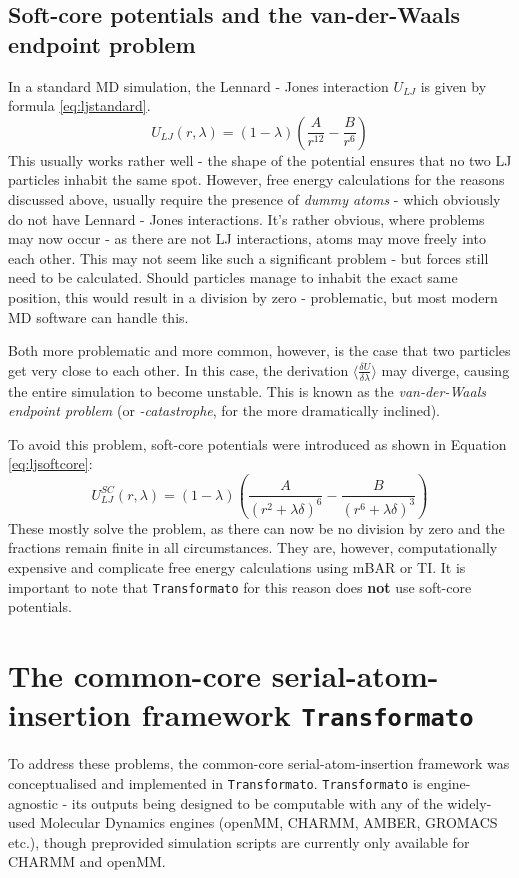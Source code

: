 \documentclass[oneside]{scrreprt}
\begin{document}
\subsection{Soft-core potentials and the van-der-Waals endpoint problem}
In a standard MD simulation, the Lennard - Jones interaction $U_{LJ}$ is given by formula \ref{eq:ljstandard}.
\begin{equation}
U_{LJ}(r,\lambda)=(1-\lambda)(\frac{A}{r^{12}} - \frac{B}{r^6})
\label{eq:ljstandard}
\end{equation}
This usually works rather well -  the shape of the potential ensures that no two LJ particles inhabit the same spot. However, free energy calculations for the reasons discussed above, usually require the presence of \textit{dummy atoms} - which obviously do not have Lennard - Jones interactions. It's rather obvious, where problems may now occur -  as there are not LJ interactions, atoms may move freely into each other. This may not seem like such a significant problem - but forces still need to be calculated. Should particles manage to inhabit the exact same position, this would result in a division by zero - problematic, but most modern MD software can handle this. 

Both more problematic and more common, however, is the case that two particles get very close to each other. In this case, the derivation $\langle \frac{\delta U}{\delta\lambda} \rangle$ may diverge, causing the entire simulation to become unstable. This is known as the \textit{van-der-Waals endpoint problem} (or \textit{-catastrophe}, for the more dramatically inclined).

To avoid this problem, soft-core potentials were introduced as shown in Equation \ref{eq:ljsoftcore}\supercite{Beutler1994Jun}:
\begin{equation}
U_{LJ}^{SC}(r,\lambda)=(1-\lambda)(\frac{A}{(r^2 +\lambda \delta)^6 }-\frac{B}{(r^6 +\lambda \delta)^3})
\label{eq:ljsoftcore}
\end{equation}
These mostly solve the problem, as there can now be no division by zero and the fractions remain finite in all circumstances. They are, however, computationally expensive and complicate free energy calculations using mBAR or TI\supercite{Li2020Aug}. It is important to note that \texttt{Transformato} for this reason does \textbf{not} use soft-core potentials.


\section{The common-core serial-atom-insertion framework {\texttt{Transformato}}}
To address these problems, the common-core serial-atom-insertion framework was conceptualised and implemented in \texttt{Transformato}. \texttt{Transformato} is engine-agnostic - its outputs being designed to be computable with any of the widely-used Molecular Dynamics engines (openMM, CHARMM, AMBER, GROMACS etc.), though preprovided simulation scripts are currently only available for CHARMM and openMM.
\end{document}
